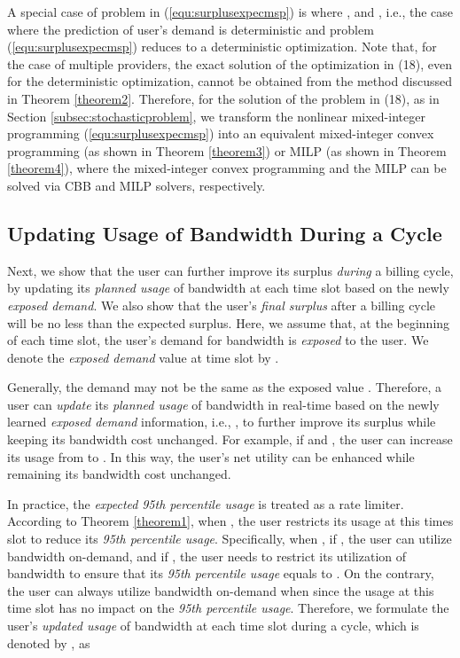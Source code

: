 \documentclass[10pt,journal,compsoc]{IEEEtran}
\begin{document}
A special case of problem in (\ref{equ:surplusexpecmsp}) is where  ,  and , i.e.,  the case where the  prediction of user's demand is deterministic and problem (\ref{equ:surplusexpecmsp}) reduces to a deterministic optimization. 
Note that, for the case of multiple providers, the exact solution of the optimization in (18), even for the deterministic optimization, cannot be obtained from the method discussed in Theorem \ref{theorem2}.  
Therefore, for the solution of the problem in (18), as in Section \ref{subsec:stochasticproblem}, we  transform the nonlinear mixed-integer programming (\ref{equ:surplusexpecmsp}) into an equivalent mixed-integer convex programming (as shown in Theorem \ref{theorem3}) or MILP (as shown in Theorem \ref{theorem4}), where the mixed-integer convex programming and the MILP can be solved via CBB and MILP solvers, respectively.



\subsection{Updating Usage of  Bandwidth  During a  Cycle}\label{subsec:after}


Next, we show that the user can further improve its surplus \emph{during} a billing cycle, by updating its \emph{planned usage} of bandwidth at each time slot based on the newly \emph{exposed demand}. We also show that the user's \emph{final surplus} after a billing cycle  will be no less  than the  expected surplus.
Here, we assume that, at the beginning of each time slot, the user's demand for bandwidth  is \emph{exposed} to the user. We denote the \emph{exposed demand} value at time slot  by .   


Generally, the demand  may not be the same as the exposed value . 
Therefore, a user can \emph{update} its \emph{planned usage} of bandwidth in real-time based on the newly learned \emph{exposed demand} information, i.e.,  , to further improve its surplus while keeping its bandwidth cost unchanged. For example, if  and , the user can increase its usage from  to . In this way, the user's net utility can be enhanced while remaining its bandwidth cost unchanged.

In practice, the  \emph{expected} \emph{95th percentile usage}  is treated as a rate limiter. According to Theorem \ref{theorem1}, when , the user restricts its usage at this times slot to reduce its \emph{95th percentile usage}. Specifically, when , if , the user can utilize bandwidth on-demand, and if , the user needs to restrict its  utilization of bandwidth to ensure that its \emph{95th percentile usage} equals to . On the contrary, the user can always utilize bandwidth on-demand when  since the usage at this time slot has no impact on the \emph{95th percentile usage}.
Therefore, we formulate the user's \emph{updated usage} of bandwidth at each time slot during a cycle, which is denoted by , as
\end{document}
